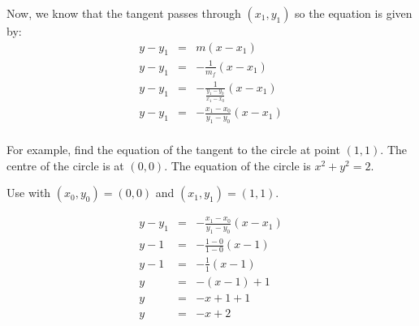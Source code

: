 Now, we know that the tangent passes through $(x_1,y_1)$ so the equation is given by:
\begin{eqnarray*}
y-y_1&=&m(x-x_1)\\
y-y_1&=&-\frac{1}{m_f}(x-x_1)\\
y-y_1&=&-\frac{1}{\frac{y_1-y_0}{x_1-x_0}}(x-x_1)\\
y-y_1&=&-\frac{x_1-x_0}{y_1-y_0}(x-x_1)\\
\end{eqnarray*}

For example, find the equation of the tangent to the circle at point $(1,1)$. The centre of the circle is at $(0,0)$. The equation of the circle is $x^2+y^2=2$.

Use  with $(x_0,y_0)=(0,0)$ and $(x_1,y_1)=(1,1)$.

\begin{eqnarray*}
y-y_1&=&-\frac{x_1-x_0}{y_1-y_0}(x-x_1)\\
y-1&=&-\frac{1-0}{1-0}(x-1)\\
y-1&=&-\frac{1}{1}(x-1)\\
y&=&-(x-1)+1\\
y&=&-x+1+1\\
y&=&-x+2
\end{eqnarray*}

